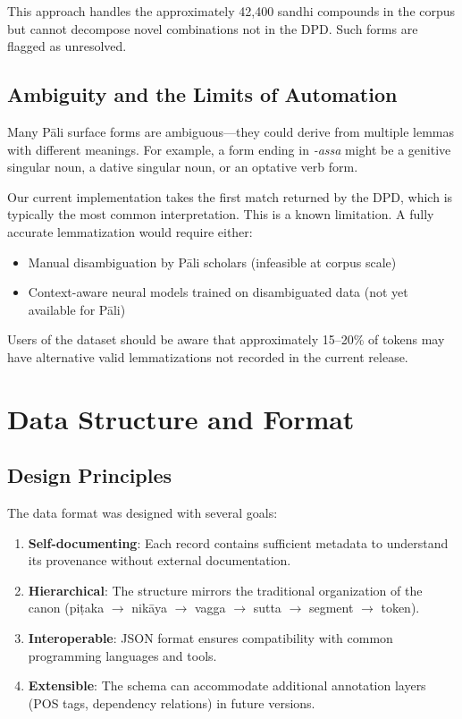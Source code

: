 \documentclass[12pt]{article}
\begin{document}
This approach handles the approximately 42,400 sandhi compounds in the corpus but cannot decompose novel combinations not in the DPD. Such forms are flagged as unresolved.

\subsection{Ambiguity and the Limits of Automation}

Many Pāli surface forms are ambiguous---they could derive from multiple lemmas with different meanings. For example, a form ending in \textit{-assa} might be a genitive singular noun, a dative singular noun, or an optative verb form.

Our current implementation takes the first match returned by the DPD, which is typically the most common interpretation. This is a known limitation. A fully accurate lemmatization would require either:

\begin{itemize}
\item Manual disambiguation by Pāli scholars (infeasible at corpus scale)
\item Context-aware neural models trained on disambiguated data (not yet available for Pāli)
\end{itemize}

Users of the dataset should be aware that approximately 15--20\% of tokens may have alternative valid lemmatizations not recorded in the current release.

\section{Data Structure and Format}

\subsection{Design Principles}

The data format was designed with several goals:

\begin{enumerate}
\item \textbf{Self-documenting}: Each record contains sufficient metadata to understand its provenance without external documentation.

\item \textbf{Hierarchical}: The structure mirrors the traditional organization of the canon (piṭaka $\rightarrow$ nikāya $\rightarrow$ vagga $\rightarrow$ sutta $\rightarrow$ segment $\rightarrow$ token).

\item \textbf{Interoperable}: JSON format ensures compatibility with common programming languages and tools.

\item \textbf{Extensible}: The schema can accommodate additional annotation layers (POS tags, dependency relations) in future versions.
\end{enumerate}
\end{document}
